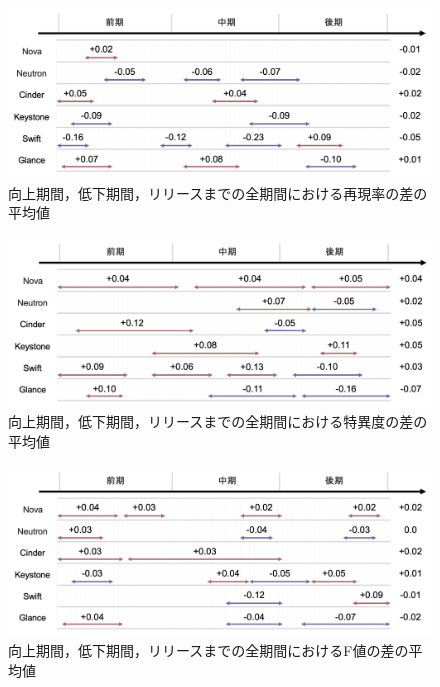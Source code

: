 \documentclass[submit]{ipsj}
\begin{document}
\begin{figure}[t]
\begin{center}
    \includegraphics[width=1.0\textwidth]{Uenaka_fig/RQ2_result/review_R.pdf}
    \caption{向上期間，低下期間，リリースまでの全期間における再現率の差の平均値}
    \label{fig:review_prepare_R}
\end{center}
\end{figure}

\begin{figure}[t]
\begin{center}
    \includegraphics[width=1.0\textwidth]{Uenaka_fig/RQ2_result/review_S.pdf}
    \caption{向上期間，低下期間，リリースまでの全期間における特異度の差の平均値}
    \label{fig:review_prepare_S}
\end{center}
\end{figure}

\begin{figure}[t]
\begin{center}
    \includegraphics[width=1.0\textwidth]{Uenaka_fig/RQ2_result/review_F.pdf}
    \caption{向上期間，低下期間，リリースまでの全期間におけるF値の差の平均値}
    \label{fig:review_prepare_F}
\end{center}
\end{figure}
\end{document}
